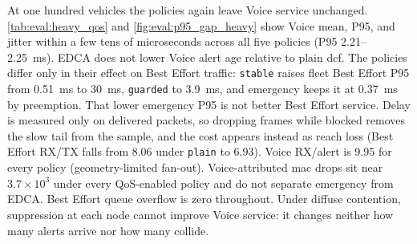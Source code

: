 At one hundred vehicles the policies again leave Voice service unchanged.
\autoref{tab:eval:heavy_qos} and \autoref{fig:eval:p95_gap_heavy} show Voice mean, P95, and jitter within a few tens of microseconds across all five policies (P95 2.21--2.25~ms).
EDCA does not lower Voice alert age relative to plain \gls{dcf}.
The policies differ only in their effect on Best Effort traffic: \texttt{stable} raises fleet Best Effort P95 from 0.51~ms to 30~ms, \texttt{guarded} to 3.9~ms, and emergency keeps it at 0.37~ms by preemption.
That lower emergency P95 is not better Best Effort service.
Delay is measured only on delivered packets, so dropping frames while blocked removes the slow tail from the sample, and the cost appears instead as reach loss (Best Effort RX/TX falls from 8.06 under \texttt{plain} to 6.93).
Voice RX/alert is 9.95 for every policy (geometry-limited fan-out).
Voice-attributed \gls{mac} drops sit near $3.7\times10^{3}$ under every QoS-enabled policy and do not separate emergency from EDCA.
Best Effort queue overflow is zero throughout.
Under diffuse contention, suppression at each node cannot improve Voice service: it changes neither how many alerts arrive nor how many collide.

